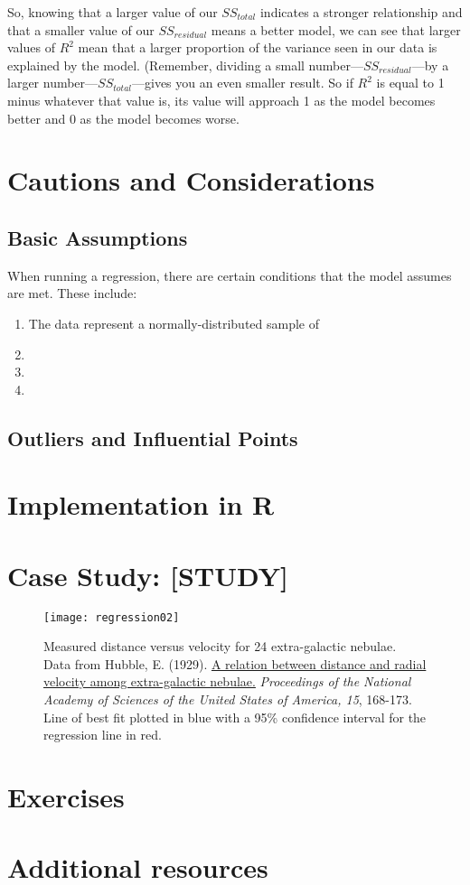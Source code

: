 So, knowing that a larger value of our $SS_{total}$ indicates a stronger relationship and that a smaller value of our $SS_{residual}$ means a better model, we can see that larger values of $R^2$ mean that a larger proportion of the variance seen in our data is explained by the model. (Remember, dividing a small number---$SS_{residual}$---by a larger number---$SS_{total}$---gives you an even smaller result. So if $R^2$ is equal to 1 minus whatever that value is, its value will approach 1 as the model becomes better and 0 as the model becomes worse.

\section{Cautions and Considerations}

\subsection{Basic Assumptions}

When running a regression, there are certain conditions that the model assumes are met. These include:
\begin{enumerate}
	\item The data represent a normally-distributed sample of 
	\item 
	\item 
	\item 
\end{enumerate}

\subsection{Outliers and Influential Points}

\section{Implementation in R}

\section{Case Study: [STUDY]}

\begin{figure}[h]
\texttt{[image: regression02]}
\label{fig:regression02}
\caption{Measured distance versus velocity for 24 extra-galactic nebulae. Data from Hubble, E. (1929). \href{http://www.ncbi.nlm.nih.gov/pmc/articles/PMC522427/}{A relation between distance and radial velocity among extra-galactic nebulae.} \textit{Proceedings of the National Academy of Sciences of the United States of America, 15}, 168-173. Line of best fit plotted in blue with a 95\% confidence interval for the regression line in red.}
\end{figure}
\section{Exercises}

\section{Additional resources}